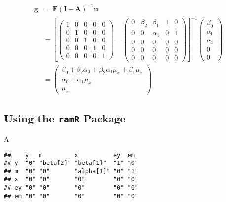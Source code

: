 \documentclass[
]{book}
\newenvironment{Shaded}{\begin{snugshade}}{\end{snugshade}}
\newcommand{\NormalTok}[1]{#1}
\theoremstyle{definition}
\theoremstyle{definition}
\theoremstyle{definition}
\theoremstyle{remark}
\begin{document}
\begin{align*}\mathbf{g} &=\mathbf{F} \left( \mathbf{I} - \mathbf{A} \right)^{-1} \mathbf{u}\\ &=\left[\left( \begin{array}{ccccc} 1 & 0 & 0 & 0 & 0 \\ 0 & 1 & 0 & 0 & 0 \\ 0 & 0 & 1 & 0 & 0 \\ 0 & 0 & 0 & 1 & 0 \\ 0 & 0 & 0 & 0 & 1 \end{array} \right)-\left( \begin{array}{ccccc} 0 & \beta  _{2} & \beta  _{1} & 1 & 0 \\ 0 & 0 & \alpha  _{1} & 0 & 1 \\ 0 & 0 & 0 & 0 & 0 \\ 0 & 0 & 0 & 0 & 0 \\ 0 & 0 & 0 & 0 & 0 \end{array} \right)\right]^{-1}\left( \begin{array}{c} \beta  _{0} \\ \alpha  _{0} \\ \mu  _{x} \\ 0 \\ 0 \end{array} \right)\\ &=\left( \begin{array}{c} \beta  _{0} + \beta  _{2} \alpha  _{0} + \beta  _{2} \alpha  _{1} \mu  _{x} + \beta  _{1} \mu  _{x} \\ \alpha  _{0} + \alpha  _{1} \mu  _{x} \\ \mu  _{x} \end{array} \right)\end{align*}

\hypertarget{using-the-ramr-package-4}{%
\subsection{\texorpdfstring{Using the \texttt{ramR} Package}{Using the ramR Package}}\label{using-the-ramr-package-4}}

\begin{Shaded}
\begin{Highlighting}[]
\NormalTok{A}
\end{Highlighting}
\end{Shaded}

\begin{verbatim}
##    y   m         x          ey  em 
## y  "0" "beta[2]" "beta[1]"  "1" "0"
## m  "0" "0"       "alpha[1]" "0" "1"
## x  "0" "0"       "0"        "0" "0"
## ey "0" "0"       "0"        "0" "0"
## em "0" "0"       "0"        "0" "0"
\end{verbatim}
\end{document}
